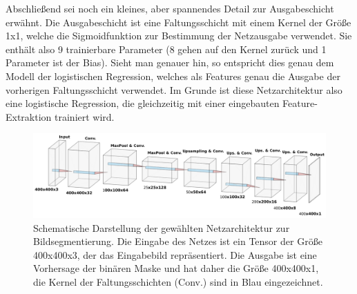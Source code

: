 Abschlie{\ss}end sei noch ein kleines, aber spannendes
Detail zur Ausgabeschicht erw\"ahnt.
Die Ausgabeschicht ist eine Faltungsschicht mit einem Kernel der
Gr\"o{\ss}e 1x1, welche die Sigmoidfunktion zur Bestimmung der
Netzausgabe verwendet. Sie enth\"alt also 9 trainierbare Parameter
(8 gehen auf den Kernel zur\"uck und 1 Parameter ist der Bias).
Sieht man genauer hin, so entspricht dies genau dem Modell
der logistischen Regression, welches als Features genau die Ausgabe
der vorherigen Faltungsschicht verwendet.
Im Grunde ist diese Netzarchitektur also eine logistische Regression, die
gleichzeitig mit einer eingebauten Feature-Extraktion trainiert wird.

\begin{figure}
    \centering
    \includegraphics[width=\textwidth]{abbildungen/network_architecture}
    \caption[Netzarchitektur]{Schematische Darstellung der gew\"ahlten Netzarchitektur
    zur Bildsegmentierung. Die Eingabe des Netzes ist ein Tensor
    der Gr\"o{\ss}e 400x400x3, der das Eingabebild repr\"asentiert.
    Die Ausgabe ist eine Vorhersage der bin\"aren Maske und hat daher die
    Gr\"o{\ss}e 400x400x1, die Kernel der Faltungsschichten (Conv.) sind
    in Blau eingezeichnet.}
    \label{fig:netzarchitektur}
\end{figure}

